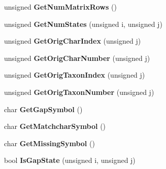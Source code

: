 \begin{DoxyCompactItemize}
\item 
\hypertarget{classNxsCharactersBlock_a74ebd4179a89e6c378fd4b5297ad4ebf}{
unsigned {\bfseries GetNumMatrixRows} ()}
\label{classNxsCharactersBlock_a74ebd4179a89e6c378fd4b5297ad4ebf}

\item 
\hypertarget{classNxsCharactersBlock_ad20d075197ab074d653d01fe8b073289}{
unsigned {\bfseries GetNumStates} (unsigned i, unsigned j)}
\label{classNxsCharactersBlock_ad20d075197ab074d653d01fe8b073289}

\item 
\hypertarget{classNxsCharactersBlock_a5ba82311067498a6fd9dcdb15850a617}{
unsigned {\bfseries GetOrigCharIndex} (unsigned j)}
\label{classNxsCharactersBlock_a5ba82311067498a6fd9dcdb15850a617}

\item 
\hypertarget{classNxsCharactersBlock_ad36d67a9d545e2f92ff11632f366a181}{
unsigned {\bfseries GetOrigCharNumber} (unsigned j)}
\label{classNxsCharactersBlock_ad36d67a9d545e2f92ff11632f366a181}

\item 
\hypertarget{classNxsCharactersBlock_a69cfbe6acdf4bfc6f08c0aa976aadaf3}{
unsigned {\bfseries GetOrigTaxonIndex} (unsigned j)}
\label{classNxsCharactersBlock_a69cfbe6acdf4bfc6f08c0aa976aadaf3}

\item 
\hypertarget{classNxsCharactersBlock_a304faaeb4e1e4288e0b1129e6a92c3d9}{
unsigned {\bfseries GetOrigTaxonNumber} (unsigned j)}
\label{classNxsCharactersBlock_a304faaeb4e1e4288e0b1129e6a92c3d9}

\item 
\hypertarget{classNxsCharactersBlock_a4b8703839c71602a102aed13c6633519}{
char {\bfseries GetGapSymbol} ()}
\label{classNxsCharactersBlock_a4b8703839c71602a102aed13c6633519}

\item 
\hypertarget{classNxsCharactersBlock_a50da85f7069ada52108f0b823c4560f4}{
char {\bfseries GetMatchcharSymbol} ()}
\label{classNxsCharactersBlock_a50da85f7069ada52108f0b823c4560f4}

\item 
\hypertarget{classNxsCharactersBlock_ae8bd3c4778a0e9932580fb144c11afea}{
char {\bfseries GetMissingSymbol} ()}
\label{classNxsCharactersBlock_ae8bd3c4778a0e9932580fb144c11afea}

\item 
\hypertarget{classNxsCharactersBlock_a17e72cc245c600ee8722fb69f751874e}{
bool {\bfseries IsGapState} (unsigned i, unsigned j)}
\label{classNxsCharactersBlock_a17e72cc245c600ee8722fb69f751874e}


\end{DoxyCompactItemize}
